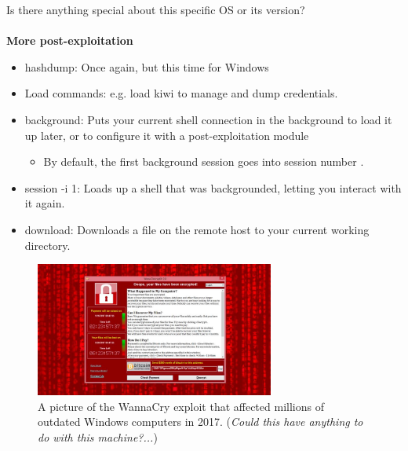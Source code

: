 \documentclass[a4paper,11pt]{article}
\renewcommand{\tt}[2][tt]{\textcolor{#1}{\ttfamily #2}}%
\begin{document}
Is there anything special about this specific OS or its version?
\\
\\
{\bfseries More post-exploitation}
\begin{itemize}
    \item \tt {hashdump}: Once again, but this time for Windows
    \item Load  commands: e.g. \tt{load kiwi} to manage and dump credentials.
    \item \tt{background}: Puts your current shell connection in the background to load it up later, or to configure it with a post-exploitation module
    \begin{itemize}
        \item By default, the first background session goes into session number \tt{1}.
    \end{itemize}
    \item \tt{session -i 1}: Loads up a shell that was backgrounded, letting you interact with it again.
    \item \tt{download}: Downloads a file on the remote host to your current working directory.
\end{itemize}

\begin{figure}[h]
    \vspace{2cm}
    \centering
    \includegraphics[width=0.7\textwidth]{images/wanancry.jpg}
    \caption{A picture of the WannaCry exploit that affected millions of outdated Windows computers in 2017. (\textit{Could this have anything to do with this machine?...})}
\end{figure}

\pagebreak
\end{document}
